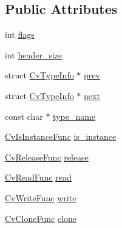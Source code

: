 \subsection*{Public Attributes}
\begin{DoxyCompactItemize}
\item 
int \hyperlink{structCvTypeInfo_ae68f124ef51d1c22341f3e4f136e6f3c}{flags}
\item 
int \hyperlink{structCvTypeInfo_a5a0375b03a8270afe60c0f9a98429498}{header\-\_\-size}
\item 
struct \hyperlink{structCvTypeInfo}{Cv\-Type\-Info} $\ast$ \hyperlink{structCvTypeInfo_a9a100c3014476d4b29370b7691ee00b8}{prev}
\item 
struct \hyperlink{structCvTypeInfo}{Cv\-Type\-Info} $\ast$ \hyperlink{structCvTypeInfo_a155be5ea57dea17be45e3558159ef9e9}{next}
\item 
const char $\ast$ \hyperlink{structCvTypeInfo_a5c2f556a91e33a7551cc563f96e62b64}{type\-\_\-name}
\item 
\hyperlink{core_2types__c_8h_abd07e49f47c97204be2fbd02e2c63b31}{Cv\-Is\-Instance\-Func} \hyperlink{structCvTypeInfo_af20737be287e6e40a641d88799b6e138}{is\-\_\-instance}
\item 
\hyperlink{core_2types__c_8h_a595b2ad37ba377f23f5362d25444d53a}{Cv\-Release\-Func} \hyperlink{structCvTypeInfo_a710d618588dc17f7c5f6bb54c8e50831}{release}
\item 
\hyperlink{core_2types__c_8h_a8e2d01be88667e7d7e32b84bc7835e16}{Cv\-Read\-Func} \hyperlink{structCvTypeInfo_a6ba91ffbc845274368ea66b9c8319d7c}{read}
\item 
\hyperlink{core_2types__c_8h_a5ed695323622490c29cf59eb7d7b4547}{Cv\-Write\-Func} \hyperlink{structCvTypeInfo_a55f7489aa2cbcba7d98079014dc8d6ec}{write}
\item 
\hyperlink{core_2types__c_8h_a9bef7047bef4ac899a445cc4998c72d8}{Cv\-Clone\-Func} \hyperlink{structCvTypeInfo_a7f5564410d8178631ae0ea534a052f73}{clone}
\end{DoxyCompactItemize}


